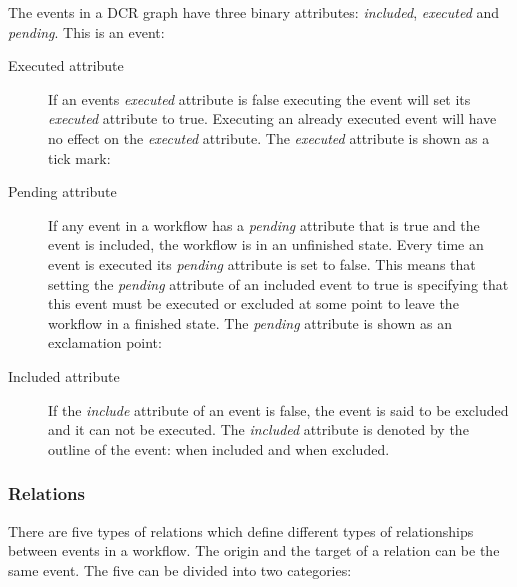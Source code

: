 \documentclass{article}
\begin{document}
			The events in a DCR graph have three binary attributes: \textit{included}, \textit{executed} and \textit{pending}.
			This is an event: 

			\begin{description}
				\item[Executed attribute] If an events \textit{executed} attribute is false executing the event will set its \textit{executed} attribute to true.
				Executing an already executed event will have no effect on the \textit{executed} attribute.
				The \textit{executed} attribute is shown as a tick mark: 
				\item[Pending attribute] If any event in a workflow has a \textit{pending} attribute that is true and the event is included, the workflow is in an unfinished state.
				Every time an event is executed its \textit{pending} attribute is set to false.
				This means that setting the \textit{pending} attribute of an included event to true is specifying that this event must be executed or excluded at some point to leave the workflow in a finished state.
				The \textit{pending} attribute is shown as an exclamation point: 
				\item[Included attribute] If the \textit{include} attribute of an event is false, the event is said to be excluded and it can not be executed.
				The \textit{included} attribute is denoted by the outline of the event:  when included and  when excluded.
			\end{description}

			\subsubsection{Relations}
			\label{subsubsec:relations}

			There are five types of relations which define different types of relationships between events in a workflow.
			The origin and the target of a relation can be the same event.
			The five can be divided into two categories:
\end{document}

